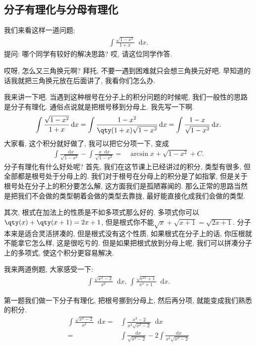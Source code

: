 \documentclass{ctexbook}
\newcommand{\e}{\mathrm{e}}
\newcommand*{\dif}{\mathop{}\!\mathrm{d}}
\begin{document}
{\subsection{分子有理化与分母有理化}
我们来看这样一道问题: 
\begin{align*}
\int\frac{\sqrt{1-x^{2}}}{1+x}\dif{x}
.\end{align*}
提问: 哪个同学有较好的解决思路? 哎, 请这位同学作答. \par
哎呀, 怎么又三角换元啊? 拜托, 不要一遇到困难就只会想三角换元好吧. 早知道的话我就把三角换元放在后面讲了, 我看你们怎么办. \par
我来讲一下吧. 当遇到这种根号在分子上的积分问题的时候呢, 我们一般性的思路是分子有理化. 通俗点说就是把根号移到分母上. 我先写一下啊. 
\begin{align*}
\int\frac{\sqrt{1-x^{2}}}{1+x}\dif{x}=\int\frac{1-x^{2}}{\qty(1+x)\sqrt{1-x^{2}}}\dif{x}=\int\frac{1-x}{\sqrt{1-x^{2}}}\dif{x}
.\end{align*}
大家看, 这个积分就好做了, 我可以把它分项一下, 变成
\begin{align*}
\int\frac{\dif{x}}{\sqrt{1-x^{2}}}-\int\frac{x\dif{x}}{\sqrt{1-x^{2}}}={}&\arcsin{x}+\sqrt{1-x^{2}}+C
.\end{align*}
分子有理化有什么好处呢? 首先, 我们在这节课上已经讲过的积分, 类型有很多, 但全部都是根号处于分母上的. 我们对于根号在分母上的积分是了如指掌, 但是关于根号处在分子上的积分要怎么解, 这方面我们是孤陋寡闻的. 那么正常的思路当然是把我们不会做的类型朝着会做的类型去靠拢, 最好能直接化成我们会做的类型. \par
其次, 根式在加法上的性质是不如多项式那么好的. 多项式你可以$\qty(x)+\qty(x+1)=2x+1$, 但是根式你不能$\sqrt{x}+\sqrt{x+1}=\sqrt{2x+1}$. 分子本来是适合灵活拼凑的, 但是根式没有这个性质, 如果根式在分子上的话, 你压根就不能拿它怎么样, 这是很吃亏的. 但是如果把根式放到分母上呢, 我们可以拼凑分子上的多项式, 使这个积分更容易解决. \par
我来两道例题, 大家感受一下: 
\begin{align*}
\int\frac{\sqrt{x^{2}-2}}{x^{2}}\dif{x},\,\int\frac{\sqrt{\e^{2x}+1}}{\e^{x}+1}\dif{x}
.\end{align*}\par
第一题我们做一下分子有理化, 把根号挪到分母上, 然后再分项, 就能变成我们熟悉的积分. 
\begin{align*}
\int\frac{\sqrt{x^{2}-2}}{x^{2}}\dif{x}={}&\int\frac{x^{2}-2}{x^{2}\sqrt{x^{2}-2}}\dif{x}\\
={}&\int\frac{\dif{x}}{\sqrt{x^{2}-2}}-2\int\frac{\dif{x}}{x^{2}\sqrt{x^{2}-2}}\\

\end{align*}}
\end{document}
